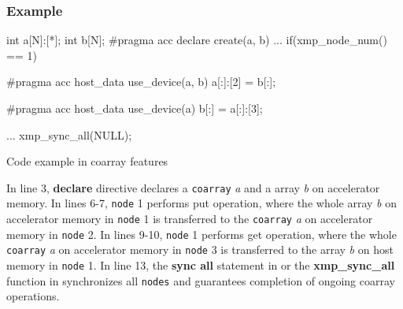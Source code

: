 \subsubsection*{Example}
\begin{myfigure}
\begin{minipage}{0.45\hsize}
\begin{center}
\end{center}
\end{minipage}
%
\begin{minipage}{0.53\hsize}
\begin{center}
\begin{XACCCexampleR}
int a[N]:[*];
int b[N];
#pragma acc declare create(a, b)
...
if(xmp_node_num() == 1){
#pragma acc host_data use_device(a, b)
  a[:]:[2] = b[:];

#pragma acc host_data use_device(a)
  b[:] = a[:]:[3];
}
...
xmp_sync_all(NULL);
\end{XACCCexampleR}
\end{center}
\end{minipage}
\caption{Code example in {\XACC} coarray features}\label{code:coarray}
\end{myfigure}

In line 3,
{\OACC} {\bf declare} directive declares a {\tt coarray} {\it a} and a array {\it b} on accelerator memory.
In lines 6-7,
{\tt node} 1 performs put operation, where
the whole array {\it b} on accelerator memory in {\tt node} 1 is transferred to the {\tt coarray} {\it a} on accelerator memory in {\tt node} 2.
In lines 9-10,
{\tt node} 1 performs get operation, where
the whole {\tt coarray} {\it a} on accelerator memory in {\tt node} 3 is transferred to the array {\it b} on host memory in {\tt node} 1.
In line 13,
the {\bf sync all} statement in {\XACCF} or the {\bf xmp\_sync\_all} function in {\XACCC} synchronizes all {\tt nodes} and guarantees completion of ongoing coarray operations.

